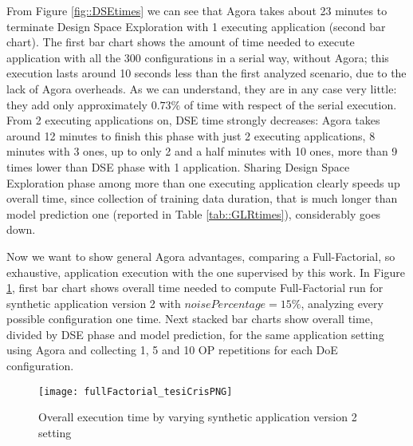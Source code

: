 From Figure \ref{fig::DSEtimes} we can see that Agora takes about 23 minutes to terminate Design Space Exploration with 1 executing application (second bar chart). The first bar chart shows the amount of time needed to execute application with all the 300 configurations in a serial way, without Agora; this execution lasts around 10 seconds less than the first analyzed scenario, due to the lack of Agora overheads. As we can understand, they are in any case very little: they add only approximately $0.73\%$ of time with respect of the serial execution. From 2 executing applications on, DSE time strongly decreases: Agora takes around 12 minutes to finish this phase with just 2 executing applications, 8 minutes with 3 ones, up to only 2 and a half minutes with 10 ones, more than 9 times lower than DSE phase with 1 application. Sharing Design Space Exploration phase among more than one executing application clearly speeds up overall time, since collection of training data duration, that is much longer than model prediction one (reported in Table \ref{tab::GLRtimes}), considerably goes down.

Now we want to show general Agora advantages, comparing a Full-Factorial, so exhaustive, application execution with the one supervised by this work. In Figure \ref{fig::full_cris}, first bar chart shows overall time needed to compute Full-Factorial run for synthetic application version 2 with $noisePercentage = 15\%$, analyzing every possible configuration one time. Next stacked bar charts show overall time, divided by DSE phase and model prediction, for the same application setting using Agora and collecting 1, 5 and 10 OP repetitions for each DoE configuration.

\begin{figure}[htb]

    \centering
    \texttt{[image: fullFactorial\_tesiCrisPNG]}
    \caption{Overall execution time by varying synthetic application version 2 setting}
    \label{fig::full_cris}
    
\end{figure}

